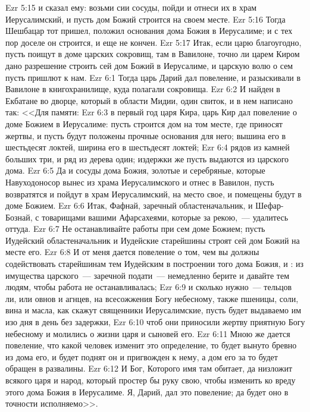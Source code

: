 \vs Ezr 5:15 и сказал ему: возьми сии сосуды, пойди и отнеси их в храм Иерусалимский, и пусть дом Божий строится на своем месте.
\vs Ezr 5:16 Тогда Шешбацар тот пришел, положил основания дома Божия в Иерусалиме; и с тех пор доселе он строится, и еще не кончен.
\vs Ezr 5:17 Итак, если царю благоугодно, пусть поищут в доме царских сокровищ, там в Вавилоне, точно ли царем Киром дано разрешение строить сей дом Божий в Иерусалиме, и царскую волю о сем пусть пришлют к нам.
\vs Ezr 6:1 Тогда царь Дарий дал повеление, и разыскивали в Вавилоне в книгохранилище, куда полагали сокровища.
\vs Ezr 6:2 И найден в Екбатане во дворце, который в области Мидии, один свиток, и в нем написано так: <<Для памяти:
\vs Ezr 6:3 в первый год царя Кира, царь Кир дал повеление о доме Божием в Иерусалиме: пусть строится дом на том месте, где приносят жертвы, и пусть будут положены прочные основания для него; вышина его в шестьдесят локтей, ширина его в шестьдесят локтей;
\vs Ezr 6:4 рядов из камней больших три, и ряд из дерева один; издержки же пусть выдаются из царского дома.
\vs Ezr 6:5 Да и сосуды дома Божия, золотые и серебряные, которые Навуходоносор вынес из храма Иерусалимского и отнес в Вавилон, пусть возвратятся и пойдут в храм Иерусалимский,  на место свое, и помещены будут в доме Божием.
\vs Ezr 6:6 Итак, Фафнай, заречный областеначальник, и Шефар-Бознай, с товарищами вашими Афарсахеями, которые за рекою,~--- удалитесь оттуда.
\vs Ezr 6:7 Не останавливайте работы при сем доме Божием; пусть Иудейский областеначальник и Иудейские старейшины строят сей дом Божий на месте его.
\vs Ezr 6:8 И от меня дается повеление о том, чем вы должны содействовать старейшинам тем Иудейским в построении того дома Божия, и : из имущества царского~---  заречной подати~--- немедленно берите и давайте тем людям, чтобы работа не останавливалась;
\vs Ezr 6:9 и сколько нужно~--- тельцов ли, или овнов и агнцев, на всесожжения Богу небесному, также пшеницы, соли, вина и масла, как скажут священники Иерусалимские, пусть будет выдаваемо им изо дня в день без задержки,
\vs Ezr 6:10 чтоб они приносили жертву приятную Богу небесному и молились о жизни царя и сыновей его.
\vs Ezr 6:11 Мною же дается повеление, что  какой человек изменит это определение, то будет вынуто бревно из дома его, и будет поднят он и пригвожден к нему, а дом его за то будет обращен в развалины.
\vs Ezr 6:12 И Бог, Которого имя там обитает, да низложит всякого царя и народ, который простер бы руку свою, чтобы изменить  ко вреду этого дома Божия в Иерусалиме. Я, Дарий, дал это повеление; да будет оно в точности исполняемо>>.
